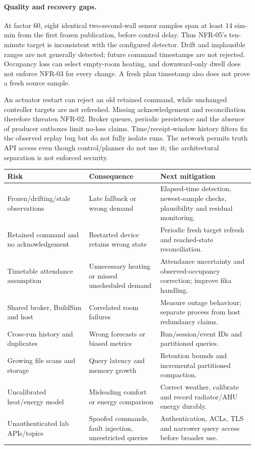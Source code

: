 \documentclass[11pt,a4paper]{article}
\begin{document}
\paragraph{Quality and recovery gaps.}
At factor 60, eight identical two-second-wall sensor samples span at least 14 sim-min from the first frozen publication, before control delay. Thus NFR-05's ten-minute target is inconsistent with the configured detector. Drift and implausible ranges are not generally detected; future command timestamps are not rejected. Occupancy loss can select empty-room heating, and downward-only dwell does not enforce NFR-03 for every change. A fresh plan timestamp also does not prove a fresh source sample.

An actuator restart can reject an old retained command, while unchanged controller targets are not refreshed. Missing acknowledgement and reconciliation therefore threaten NFR-02. Broker queues, periodic persistence and the absence of producer outboxes limit no-loss claims. Time/receipt-window history filters fix the observed replay bug but do not fully isolate runs. The network permits truth API access even though control/planner do not use it; the architectural separation is not enforced security.

{\small\begin{longtable}{p{36mm}p{52mm}p{56mm}}\toprule Risk & Consequence & Next mitigation\\\midrule\endhead
Frozen/drifting/stale observations & Late fallback or wrong demand & Elapsed-time detection, newest-sample checks, plausibility and residual monitoring.\\
Retained command and no acknowledgement & Restarted device retains wrong state & Periodic fresh target refresh and reached-state reconciliation.\\
Timetable attendance assumption & Unnecessary heating or missed unscheduled demand & Attendance uncertainty and observed-occupancy correction; improve fika handling.\\
Shared broker, BuildSim and host & Correlated room failures & Measure outage behaviour; separate process from host redundancy claims.\\
Cross-run history and duplicates & Wrong forecasts or biased metrics & Run/session/event IDs and partitioned queries.\\
Growing file scans and storage & Query latency and memory growth & Retention bounds and incremental partitioned compaction.\\
Uncalibrated heat/energy model & Misleading comfort or energy comparison & Correct weather, calibrate and record radiator/AHU energy durably.\\
Unauthenticated lab APIs/topics & Spoofed commands, fault injection, unrestricted queries & Authentication, ACLs, TLS and narrower query access before broader use.\\\bottomrule\end{longtable}}
\end{document}
